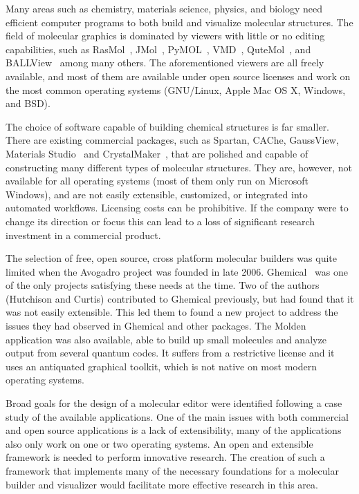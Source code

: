\documentclass[10pt]{bmc_article}
\newenvironment{bmcformat}{\begin{raggedright}
\baselineskip20pt\sloppy\setboolean{publ}{false}}{\end{raggedright}
\baselineskip20pt\sloppy}
\begin{document}
\begin{bmcformat}
Many areas such as chemistry, materials science, physics, and biology need
efficient computer programs to both build and visualize molecular structures.
The field of molecular graphics is dominated by viewers with little or no
editing capabilities, such as RasMol~\cite{RasMol}, JMol~\cite{JMol},
PyMOL~\cite{PyMOL}, VMD~\cite{VMD}, QuteMol~\cite{QuteMol}, and
BALLView~\cite{BALLView} among many others. The aforementioned viewers are all
freely available, and most of them are available under open source licenses and
work on the most common operating systems (GNU/Linux, Apple Mac OS X, Windows,
and
BSD).

The choice of software capable of building chemical structures is far smaller.
There are existing commercial packages, such as Spartan, CAChe, GaussView,
Materials Studio~\cite{Accelrys} and CrystalMaker~\cite{CrystalMaker}, that are
polished and capable of constructing many different types of molecular
structures. They are, however, not available for all operating systems (most of
them only run on Microsoft Windows), and are not easily extensible, customized,
or
integrated into automated workflows. Licensing costs can be prohibitive. If
the company were to change its direction or focus this can lead to a loss of
significant research investment in a commercial product.

The selection of free, open source, cross platform molecular builders was quite
limited when the Avogadro project was founded in late 2006.
Ghemical~\cite{Ghemical} was one of the only projects satisfying these needs at
the time. Two of the authors (Hutchison and Curtis) contributed to Ghemical
previously, but had found that it was not easily extensible. This led them to
found a new project to address the issues they had observed in Ghemical
and other packages. The Molden~\cite{Molden} application was also available,
able to build up small molecules and analyze output from several quantum codes.
It suffers from a restrictive license and it uses an antiquated graphical
toolkit, which is not native on most modern operating systems.

Broad goals for the design of a molecular editor were identified following a
case study of the available applications. One of the main issues with both
commercial and open source applications is a lack of extensibility, many of the
applications also only work on one or two operating systems. An open and
extensible framework is needed to perform innovative research. The
creation of such a framework that implements many of the necessary foundations
for a
molecular builder and visualizer would facilitate more effective research in
this area.


\end{bmcformat}
\end{document}
